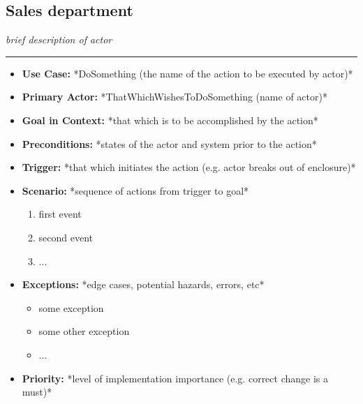 \documentclass[12pt]{article}
\begin{document}
    \subsection{Sales department}
    \textit{brief description of actor}
    \par\noindent\rule{\textwidth}{0.4pt}    
    \begin{itemize}
        \item[]\textbf{Use Case:}                                
            *DoSomething (the name of the action to be executed by actor)*

        \item[]\textbf{Primary Actor:}
            *ThatWhichWishesToDoSomething (name of actor)*

        \item[]\textbf{Goal in Context:}
            *that which is to be accomplished by the action*

        \item[]\textbf{Preconditions:}
            *states of the actor and system prior to the action*

        \item[]\textbf{Trigger:}
            *that which initiates the action (e.g. actor breaks out of enclosure)*

        \item[]\textbf{Scenario:}
            *sequence of actions from trigger to goal*
            \begin{enumerate}
                \item first event
                \item second event
                \item ...
            \end{enumerate}

        \item[]\textbf{Exceptions:}
            *edge cases, potential hazards, errors, etc*
            \begin{itemize}
                \item[] some exception
                \item[] some other exception                
                \item[] ...
            \end{itemize}

        \item[]\textbf{Priority:}
            *level of implementation importance (e.g. correct change is a must)*


\end{itemize}
\end{document}
